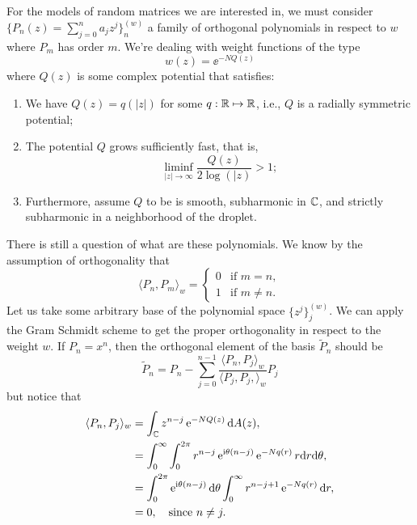 For the models of random matrices we are interested in, we must consider $\{P_n(z) = \sum_{j=0}^{n} a_j z^j\}_{n}^{(w)}$ a family of orthogonal polynomials in respect to $w$ where $P_m$ has order $m$. We're dealing with weight functions of the type
\begin{equation}
	w(z) = \ee^{-N Q(z)}
\end{equation} 
where $Q(z)$ is some complex potential that satisfies:
\begin{enumerate}
	\item We have $Q(z) = q(|z|)$ for some $q: \mathbb{R} \mapsto \mathbb{R}$, i.e., $Q$ is a radially symmetric potential;
	\item The potential $Q$ grows sufficiently fast, that is, 
	\begin{equation}
		\liminf_{|z| \rightarrow \infty} \frac{Q(z)}{2 \log(|z)} > 1;
	\end{equation}
	\item Furthermore, assume $Q$ to be is smooth, subharmonic in $\mathbb{C}$, and strictly subharmonic in a neighborhood of the droplet.
	\label{Equation: properties Complex Potential}
\end{enumerate}
There is still a question of what are these polynomials. We know by the assumption of orthogonality that
\begin{equation}
	\langle P_n, P_m \rangle_w = 
	\begin{cases}
		0 & \text{if $m = n$}, \\
		1 & \text{if $m \neq n$}.
	\end{cases}
\end{equation} 
Let us take some arbitrary base of the polynomial space $\{z^j\}_j^{(w)}$. We can apply the Gram Schmidt scheme to get the proper orthogonality in respect to the weight $w$. If $P_n = x^n$, then the orthogonal element of the basis $\tilde{P}_n$ should be
\begin{equation}
	\tilde{P}_n = P_n - \sum_{j=0}^{n-1} \frac{\langle P_n, P_{j} \rangle_w}{\langle P_{j}, P_{j}, \rangle_w} P_{j}
\end{equation}
but notice that
\begin{align}
	\langle P_n, P_{j} \rangle_w & = \int_{\mathbb{C}} z^{n-j} \operatorname{e}^{-N Q(z)} \mathrm{d} A(z), \\
	& = \int_{0}^{\infty} \int_{0}^{2\pi} r^{n-j} \operatorname{e}^{\mathrm{i} \theta (n - j)} \operatorname{e}^{-N q(r)} r \mathrm{d} r \mathrm{d} \theta, \\
	& = \int_{0}^{2\pi} \operatorname{e}^{\mathrm{i} \theta (n - j)} \mathrm{d} \theta \int_{0}^{\infty} r^{n-j+1} \operatorname{e}^{-N q(r)} \mathrm{d} r, \\
	& = 0, \quad \text{since} \  n \neq j.
\end{align}
